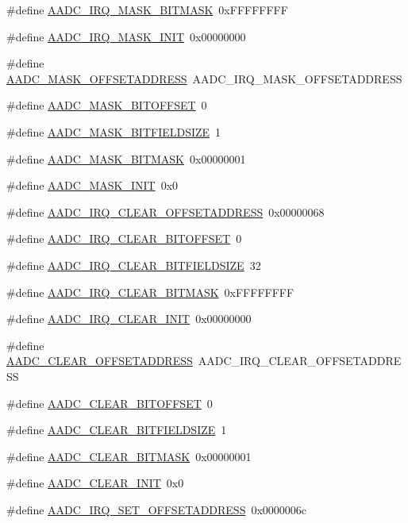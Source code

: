 \begin{DoxyCompactItemize}
\#define \hyperlink{a00543_a0ce9ee309e8a30afe32961d648884534}{AADC\_\-IRQ\_\-MASK\_\-BITMASK}~0xFFFFFFFF
\item 
\#define \hyperlink{a00543_a76d66e9095b465a199d9e59030ac300b}{AADC\_\-IRQ\_\-MASK\_\-INIT}~0x00000000
\item 
\#define \hyperlink{a00543_a6ccdf9b9fffbc49f3080b0fed23d5a2e}{AADC\_\-MASK\_\-OFFSETADDRESS}~AADC\_\-IRQ\_\-MASK\_\-OFFSETADDRESS
\item 
\#define \hyperlink{a00543_ae106fa4e4bd4e3760861cb4395c205e4}{AADC\_\-MASK\_\-BITOFFSET}~0
\item 
\#define \hyperlink{a00543_a128a28cb1d25fd2f2c3e003fbe6c60ad}{AADC\_\-MASK\_\-BITFIELDSIZE}~1
\item 
\#define \hyperlink{a00543_a4243014e2a6dc466d281580d5fafc417}{AADC\_\-MASK\_\-BITMASK}~0x00000001
\item 
\#define \hyperlink{a00543_a138be4490852223afcaf6fd554ec344d}{AADC\_\-MASK\_\-INIT}~0x0
\item 
\#define \hyperlink{a00543_a88ee6b533b64d9096d1f09d4f4bbdf25}{AADC\_\-IRQ\_\-CLEAR\_\-OFFSETADDRESS}~0x00000068
\item 
\#define \hyperlink{a00543_a916b6a5c5743f3997304235361fa68e5}{AADC\_\-IRQ\_\-CLEAR\_\-BITOFFSET}~0
\item 
\#define \hyperlink{a00543_aeda7c5969e31a53cbc263e606b1fc595}{AADC\_\-IRQ\_\-CLEAR\_\-BITFIELDSIZE}~32
\item 
\#define \hyperlink{a00543_ae377e7267f6e12dad91387b2046e8d42}{AADC\_\-IRQ\_\-CLEAR\_\-BITMASK}~0xFFFFFFFF
\item 
\#define \hyperlink{a00543_aeec2bd0dbbc70414fe6fb3b5456ffcd7}{AADC\_\-IRQ\_\-CLEAR\_\-INIT}~0x00000000
\item 
\#define \hyperlink{a00543_a0981e9bb59a70dc59ecdae3856fefe5c}{AADC\_\-CLEAR\_\-OFFSETADDRESS}~AADC\_\-IRQ\_\-CLEAR\_\-OFFSETADDRESS
\item 
\#define \hyperlink{a00543_ad52b4235cc5b55a7ae100b415cc68df7}{AADC\_\-CLEAR\_\-BITOFFSET}~0
\item 
\#define \hyperlink{a00543_a292dad54c77769c60bff2a1450302d66}{AADC\_\-CLEAR\_\-BITFIELDSIZE}~1
\item 
\#define \hyperlink{a00543_a7cf3d6085eed426db92284a9ce9428e0}{AADC\_\-CLEAR\_\-BITMASK}~0x00000001
\item 
\#define \hyperlink{a00543_a832ae19400da9482101be3e6c44d635d}{AADC\_\-CLEAR\_\-INIT}~0x0
\item 
\#define \hyperlink{a00543_ac287c428dde7b3ac0c855488831d2f35}{AADC\_\-IRQ\_\-SET\_\-OFFSETADDRESS}~0x0000006c

\end{DoxyCompactItemize}
